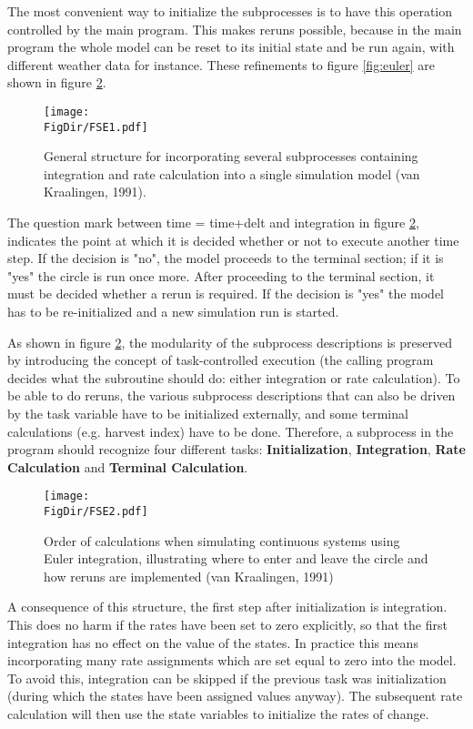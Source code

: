 The most conve\-nient way to initialize the subprocesses is to have this operation controlled
by the main program. This makes reruns possible, because in the main  program the
whole model can be reset to its initial state and be run again, with different weather data
for instance. These refinements to figure \ref{fig:euler} are shown in figure \ref{fig:fse_order}.

\begin{figure}[p]
\centering
\texttt{[image: \\FigDir/FSE1.pdf]}
\caption{Gen\-er\-al s\-t\-ruc\-t\-ure for in\-corporating several subprocesses 
containing integra\-tion and rate cal\-culation into a single simulation model (van Kraalingen,
1991).}
\label{fig:fse_struct}
\end{figure}

The question mark between time = time+delt and integration in figure \ref{fig:fse_order}, indicates the
point at which it is decided whether or not to execute another time step. If the decision is
"no", the model proceeds to the terminal section; if it is "yes" the circle is run once
more. After proceeding to the terminal section, it must be decided whether a rerun is
required. If the decision is "yes" the model has to be re-initialized and a new simula\-tion
run is started.

As shown in figure \ref{fig:fse_order}, the modularity of the subprocess descriptions is preserved by
introducing the concept of task-controlled execution (the calling program decides what the
subroutine should do: either integration or rate calculation). To be able to do reruns, the
various subprocess descriptions that can also be driven by the task variable have to be
initialized externally, and some terminal calculations (e.g. harvest index) have to be done.
Therefore, a subprocess in the program should recognize four different tasks: {\bf Initializa\-tion}, 
{\bf Integration}, {\bf Rate Calcula\-tion} and {\bf Terminal Calcula\-tion}.

\begin{figure}[p]
\centering
\texttt{[image: \\FigDir/FSE2.pdf]}
\caption{Order of cal\-cu\-la\-tions when simulating continuous systems using Euler
integra\-tion, illustrating where to enter and leave the circle and how reruns
are implemented (van Kraalingen, 1991)}
\label{fig:fse_order}
\end{figure}

A consequence of this structure, the first step after initialization is integration. This does
no harm if the rates have been set to zero explicitly, so that the first integration has no
effect on the value of the states. In practice this means incorporat\-ing many rate assign\-ments 
which are set equal to zero into the model. To avoid this, integration can be
skipped if the previous task was initialization (during which the states have been assigned
values anyway). The subsequent rate calculation will then use the state variables to
initialize the rates of change.

